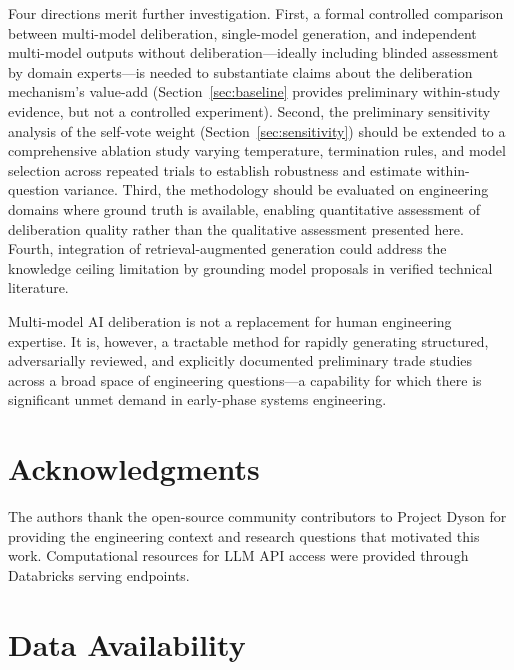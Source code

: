 \documentclass[11pt,a4paper]{article}
\begin{document}
Four directions merit further investigation. First, a formal controlled comparison between multi-model deliberation, single-model generation, and independent multi-model outputs without deliberation---ideally including blinded assessment by domain experts---is needed to substantiate claims about the deliberation mechanism's value-add (Section~\ref{sec:baseline} provides preliminary within-study evidence, but not a controlled experiment). Second, the preliminary sensitivity analysis of the self-vote weight (Section~\ref{sec:sensitivity}) should be extended to a comprehensive ablation study varying temperature, termination rules, and model selection across repeated trials to establish robustness and estimate within-question variance. Third, the methodology should be evaluated on engineering domains where ground truth is available, enabling quantitative assessment of deliberation quality rather than the qualitative assessment presented here. Fourth, integration of retrieval-augmented generation could address the knowledge ceiling limitation by grounding model proposals in verified technical literature.

Multi-model AI deliberation is not a replacement for human engineering expertise. It is, however, a tractable method for rapidly generating structured, adversarially reviewed, and explicitly documented preliminary trade studies across a broad space of engineering questions---a capability for which there is significant unmet demand in early-phase systems engineering.

\section*{Acknowledgments}

The authors thank the open-source community contributors to Project Dyson for providing the engineering context and research questions that motivated this work. Computational resources for LLM API access were provided through Databricks serving endpoints.

\section*{Data Availability}
\end{document}
